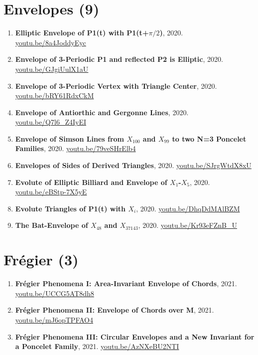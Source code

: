 \documentclass[12pt]{article}
\begin{document}
\section{Envelopes (9)}

\begin{enumerate}[resume]
\item \textbf{Elliptic Envelope of P1(t) with P1(t+$\pi/2$)}, 2020. \href{https://youtu.be/8a4JoddyEyc}{\url{youtu.be/8a4JoddyEyc}}
\item \textbf{Envelope of 3-Periodic P1 and reflected P2 is Elliptic}, 2020. \href{https://youtu.be/GJgiUulX1aU}{\url{youtu.be/GJgiUulX1aU}}
\item \textbf{Envelope of 3-Periodic Vertex with Triangle Center}, 2020. \href{https://youtu.be/bRY61RdxCkM}{\url{youtu.be/bRY61RdxCkM}}
\item \textbf{Envelope of Antiorthic and Gergonne Lines}, 2020. \href{https://youtu.be/Q7l6_Z4IyEI}{\url{youtu.be/Q7l6\_Z4IyEI}}
\item \textbf{Envelope of Simson Lines from $X_{100}$ and $X_{99}$ to two N=3 Poncelet Families}, 2020. \href{https://youtu.be/79veSHrElb4}{\url{youtu.be/79veSHrElb4}}
\item \textbf{Envelopes of Sides of Derived Triangles}, 2020. \href{https://youtu.be/SJrgWtdX8xU}{\url{youtu.be/SJrgWtdX8xU}}
\item \textbf{Evolute of Elliptic Billiard and Envelope of $X_{1}$-$X_{5}$}, 2020. \href{https://youtu.be/eBStp-7X5yE}{\url{youtu.be/eBStp-7X5yE}}
\item \textbf{Evolute Triangles of P1(t) with $X_i$}, 2020. \href{https://youtu.be/DhqDdMAlBZM}{\url{youtu.be/DhqDdMAlBZM}}
\item \textbf{The Bat-Envelope of $X_{48}$ and $X_{37143}$}, 2020. \href{https://youtu.be/Kr93eFZnB_U}{\url{youtu.be/Kr93eFZnB\_U}}
\end{enumerate}

\section{Frégier (3)}

\begin{enumerate}[resume]
\item \textbf{Frégier Phenomena I: Area-Invariant Envelope of Chords}, 2021. \href{https://youtu.be/UCCG5AT8dh8}{\url{youtu.be/UCCG5AT8dh8}}
\item \textbf{Frégier Phenomena II: Envelope of Chords over M}, 2021. \href{https://youtu.be/mJ6opTPFAO4}{\url{youtu.be/mJ6opTPFAO4}}
\item \textbf{Frégier Phenomena III: Circular Envelopes and a New Invariant for a Poncelet Family}, 2021. \href{https://youtu.be/AzNXeBU2NTI}{\url{youtu.be/AzNXeBU2NTI}}
\end{enumerate}
\end{document}
